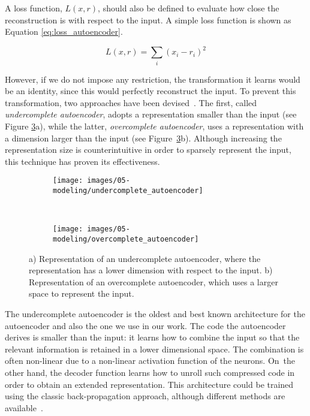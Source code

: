 A {loss function}, $L(x, r)$, should also be defined to evaluate how close the reconstruction is with respect to the input.
A simple loss function is shown as Equation \eqref{eq:loss_autoencoder}.

\begin{equation} \label{eq:loss_autoencoder}
L(x,r) = \sum_{i} (x_i - r_i)^2
\end{equation}

However, if we do not impose any restriction, the transformation it learns would be an identity, since this would perfectly reconstruct the input. To prevent this transformation, two approaches have been devised~\citep{goodfellow_deep_2016}. The first, called \textit{undercomplete autoencoder}, adopts a representation smaller than the input (see Figure \ref{fig:under_over_autoencoder}a), while the latter, \textit{overcomplete autoencoder}, uses a representation with a dimension larger than the input (see Figure~\ref{fig:under_over_autoencoder}b). Although increasing the representation size is counterintuitive in order to sparsely represent the input, this technique has proven its effectiveness.

\begin{figure}[h]
\centering
    \begin{subfigure}[h]{5cm}
        \centering
        \texttt{[image: images/05-modeling/undercomplete\_autoencoder]}
        \caption{}
        \label{fig:undercomplete}
    \end{subfigure}
    ~
    \begin{subfigure}[h]{5cm}
        \centering
        \texttt{[image: images/05-modeling/overcomplete\_autoencoder]}
        \caption{}
        \label{fig:overcomplete}
    \end{subfigure}  \vspace{-6pt}
    \caption{a) Representation of an undercomplete autoencoder, where the representation has a lower dimension with respect to the input. b) Representation of an overcomplete autoencoder, which uses a larger space to represent the input.}
    \label{fig:under_over_autoencoder}
\end{figure}

The undercomplete autoencoder is the oldest and best known architecture for the autoencoder and also the one we use in our work. The code the autoencoder derives is smaller than the input: it learns how to combine the input so that the relevant information is retained in a lower dimensional space. The combination is often non-linear due to a non-linear activation function of the neurons. On~the other hand, the decoder function learns how to unroll such compressed code in order to obtain an extended representation. This architecture could be trained using the classic back-propagation approach, although different methods are available~\citep{goodfellow_deep_2016}.

